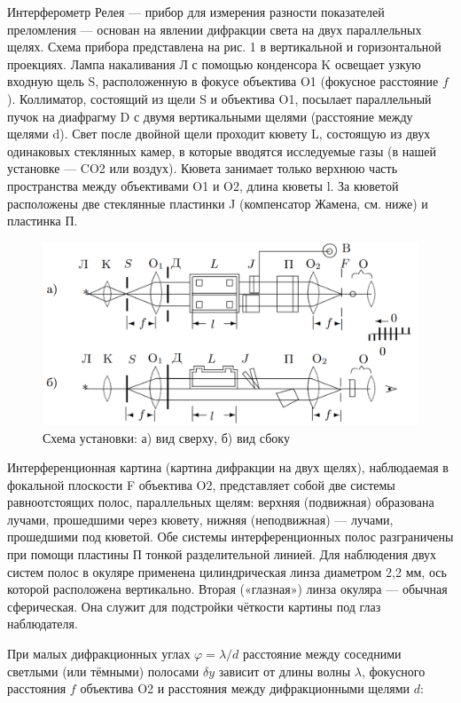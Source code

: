 	Интерферометр Релея — прибор для измерения разности показателей преломления — основан на явлении дифракции света на двух параллельных щелях. Схема прибора представлена на рис. 1 в вертикальной и горизонтальной проекциях. Лампа накаливания Л с помощью конденсора K  освещает узкую входную щель S, расположенную в фокусе объектива O1 (фокусное расстояние $f$). Коллиматор, состоящий из щели S и объектива O1, посылает параллельный пучок на диафрагму D с двумя вертикальными щелями (расстояние между щелями d). Свет после двойной щели проходит кювету L, состоящую из двух одинаковых стеклянных камер, в которые вводятся исследуемые газы (в нашей установке — CO2 или воздух). Кювета занимает только верхнюю часть пространства между объективами O1 и O2, длина кюветы l. За кюветой расположены две стеклянные пластинки J (компенсатор Жамена, см. ниже) и пластинка П.

\begin{figure}[h]
    \centering
    \includegraphics[width=0.9\linewidth]{expsc.png}
    \caption{Схема установки: а) вид сверху, б) вид сбоку}
    \label{fig:mpr} 
  \end{figure}
  
	Интерференционная картина (картина дифракции на двух щелях), наблюдаемая в фокальной плоскости F объектива O2, представляет собой две системы равноотстоящих полос, параллельных щелям: верхняя (подвижная) образована лучами, прошедшими через кювету, нижняя (неподвижная) — лучами, прошедшими под кюветой. Обе системы интерференционных полос разграничены при помощи пластины П тонкой разделительной линией. Для наблюдения двух систем полос в окуляре применена цилиндрическая линза диаметром 2,2 мм, ось которой расположена вертикально. Вторая («глазная») линза окуляра — обычная сферическая. Она служит для подстройки чёткости картины под глаз наблюдателя.

	При малых дифракционных углах $\varphi = \lambda / d$ расстояние между соседними светлыми (или тёмными) полосами $\delta y$ зависит от длины волны $\lambda$, фокусного расстояния $f$ объектива O2 и расстояния между дифракционными щелями $d$:

